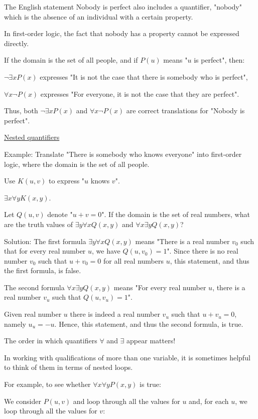 \documentclass{article}
\begin{document}
The English statement Nobody is perfect also includes a quantifier, "nobody" which is the absence of an individual with a certain property. 

In first-order logic, the fact that nobody has a property cannot be expressed directly.

If the domain is the set of all people, and if $P(u)$ means "$u$ is perfect", then:

$\neg \exists x P(x)$ expresses "It is not the case that there is somebody who is perfect",

$\forall x \neg P(x)$ expresses "For everyone, it is not the case that they are perfect".

Thus, both $\neg \exists x P(x)$ and $\forall x \neg P(x)$ are correct translations for "Nobody is perfect".

\underline{Nested quantifiers}

Example: Translate "There is somebody who knows everyone" into first-order logic, where the domain is the set of all people.

Use $K(u,v)$ to express "$u$ knows $v$".

$\exists x \forall y K(x,y)$.

Let $Q(u,v)$ denote "$u + v = 0$". If the domain is the set of real numbers, what are the truth values of $\exists y \forall x Q(x,y)$ and $\forall x \exists y Q(x,y)$? 

Solution: The first formula $\exists y \forall x Q(x,y)$ means "There is a real number $v_0$ such that for every real number $u$, we have $Q(u,v_0) = 1$". Since there is no real number $v_0$ such that $u + v_0 = 0$ for all real numbers $u$, this statement, and thus the first formula, is false.

The second formula $\forall x \exists y Q(x,y)$ means "For every real number $u$, there is a real number $v_u$ such that $Q(u,v_u) = 1$".

Given real number $u$ there is indeed a real number $v_u$ such that $u + v_u = 0$, namely $u_u = -u$. Hence, this statement, and thus the second formula, is true.

The order in which quantifiers $\forall$ and $\exists$ appear matters!

In working with qualifications of more than one variable, it is sometimes helpful to think of them in terms of nested loops.

For example, to see whether $\forall x \forall y P(x,y)$ is true:

We consider $P(u,v)$ and loop through all the values for $u$ and, for each $u$, we loop through all the values for $v$:
\end{document}
